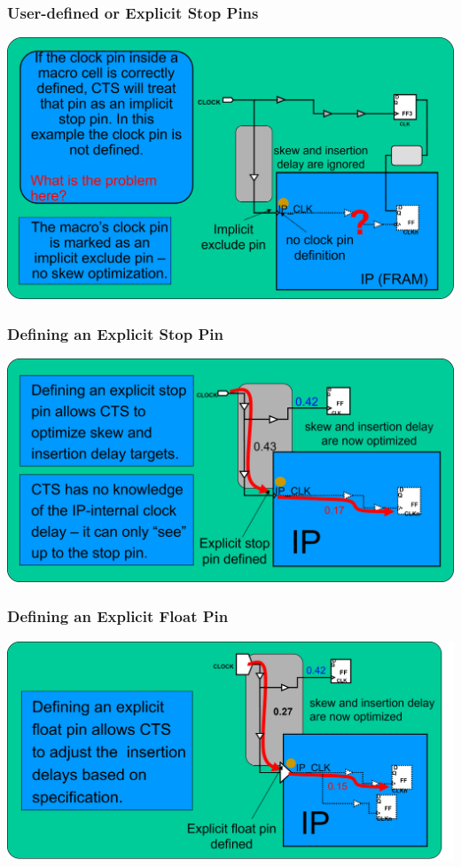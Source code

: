 \documentclass[compress]{beamer}
\begin{document}
\begin{frame}
	\frametitle{User-defined or Explicit Stop Pins}
	\begin{center}
		\includegraphics[width=\textwidth]{Stop}
	\end{center}
\end{frame}

\begin{frame}
	\frametitle{Defining an Explicit Stop Pin}
	\begin{center}
		\includegraphics[width=\textwidth]{Stop1}
	\end{center}
\end{frame}

\begin{frame}
	\frametitle{Defining an Explicit Float Pin}
	\begin{center}
	\includegraphics[width=\textwidth]{Float}
	\end{center}	
\end{frame}
\end{document}
